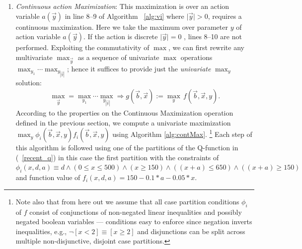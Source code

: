 \documentclass[twoside,11pt]{article}
\begin{document}
\begin{enumerate}
\begin{algorithm}[t!]
{      \;
}
\caption{\footnotesize \texttt{Continuous Maximization}($y$, $f(\vec{b},\vec{x},y)$) $\longrightarrow(max_{y}f(\vec{b},\vec{x},y))$ \label{alg:contMax}}
\vspace{-1mm}
\end{algorithm}
\decmargin{.5em}

\item {\it Continuous action Maximization}: This maximization is over an action variable $a(\vec{y})$ in line 8--9 of
Algorithm ~\ref{alg:vi} where $\mid \vec{y} \mid>0$, requires a continuous maximization. Here we take the maximum over parameter $y$ of action variable $a(\vec{y})$. If the action is discrete $\mid \vec{y} \mid=0$ , lines 8--10 are not performed.
Exploiting the commutativity of $\max$, we can first
rewrite any multivariate $\max_{\vec{y}}$ as a sequence of univariate
$\max$ operations $\max_{y_1} \cdots \max_{y_{|\vec{y}|}}$; hence it
suffices to provide just the \emph{univariate} $\max_y$ solution:
\begin{align}
\max_{\vec{y}} =\max_{y_1} \cdots \max_{y_{|\vec{y}|}} \Rightarrow g(\vec{b},\vec{x}) := \max_{y} \, f(\vec{b},\vec{x},y). \nonumber
\end{align}
According to the properties on the Continuous Maximization operation defined in the previous section, we compute a univariate maximization  
$\max_y \phi_i(\vec{b},\vec{x},y) f_i(\vec{b},\vec{x},y)$ using Algorithm \ref{alg:contMax}. 
\footnote{Note also that from here out we assume that all case partition conditions $\phi_i$ of
$f$ consist of conjunctions of non-negated linear inequalities and
possibly negated boolean variables --- conditions easy to enforce
since negation inverts inequalities, e.g., $\neg [x < 2] \equiv [x \geq 2]$
and disjunctions can be split across multiple non-disjunctive, 
disjoint case partitions.} Each step of this algorithm is followed using one of the partitions of the Q-function in (~\ref{recent_q}) in this case the first partition with the constraints of 
$\phi_i(x,d,a) \equiv d \land (0 \leq x \leq 500) \land (x \geq 150) \land ((x+a) \leq 650) \land ((x+a) \geq 150) $ and function value of $ f_i(x,d,a) = 150 - 0.1 * a - 0.05 * x$.


\end{enumerate}
\end{document}
